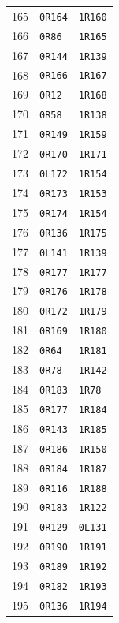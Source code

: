 \begin{center}
\begin{minipage}[t]{0.32\linewidth}
\begin{tabular}{rll}
165&\texttt{0R164}&\texttt{1R160}\\
166&\texttt{0R86}&\texttt{1R165}\\
167&\texttt{0R144}&\texttt{1R139}\\
168&\texttt{0R166}&\texttt{1R167}\\
169&\texttt{0R12}&\texttt{1R168}\\
170&\texttt{0R58}&\texttt{1R138}\\
171&\texttt{0R149}&\texttt{1R159}\\
172&\texttt{0R170}&\texttt{1R171}\\
173&\texttt{0L172}&\texttt{1R154}\\
174&\texttt{0R173}&\texttt{1R153}\\
175&\texttt{0R174}&\texttt{1R154}\\
176&\texttt{0R136}&\texttt{1R175}\\
177&\texttt{0L141}&\texttt{1R139}\\
178&\texttt{0R177}&\texttt{1R177}\\
179&\texttt{0R176}&\texttt{1R178}\\
180&\texttt{0R172}&\texttt{1R179}\\
181&\texttt{0R169}&\texttt{1R180}\\
182&\texttt{0R64}&\texttt{1R181}\\
183&\texttt{0R78}&\texttt{1R142}\\
184&\texttt{0R183}&\texttt{1R78}\\
185&\texttt{0R177}&\texttt{1R184}\\
186&\texttt{0R143}&\texttt{1R185}\\
187&\texttt{0R186}&\texttt{1R150}\\
188&\texttt{0R184}&\texttt{1R187}\\
189&\texttt{0R116}&\texttt{1R188}\\
190&\texttt{0R183}&\texttt{1R122}\\
191&\texttt{0R129}&\texttt{0L131}\\
192&\texttt{0R190}&\texttt{1R191}\\
193&\texttt{0R189}&\texttt{1R192}\\
194&\texttt{0R182}&\texttt{1R193}\\
195&\texttt{0R136}&\texttt{1R194}\\
\bottomrule\end{tabular}\end{minipage}
\end{center}
